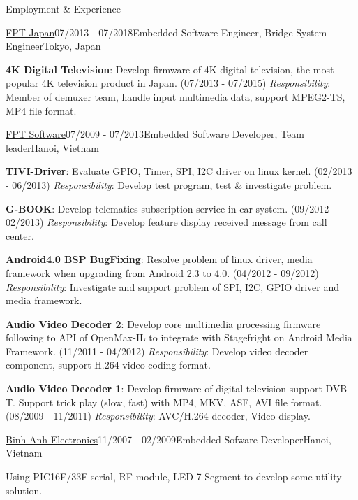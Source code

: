 \documentclass{resume}
\begin{document}
\begin{rSection}{Employment \& Experience}
\begin{rSubsection}{\href{https://www.fpt-software.jp/company-information/fpt-japan/}{\underline{FPT Japan}}}{07/2013 - 07/2018}{Embedded Software Engineer, Bridge System Engineer}{Tokyo, Japan}
    \item \textbf{4K Digital Television}: Develop firmware of 4K digital television, the most popular 4K television product in Japan. (07/2013 - 07/2015)
    \newline \textit{Responsibility}: Member of demuxer team, handle input multimedia data, support MPEG2-TS, MP4 file format.

    \end{rSubsection}

    \begin{rSubsection}{\href{https://www.fpt-software.com/}{\underline{FPT Software}}}{07/2009 - 07/2013}{Embedded Software Developer, Team leader}{Hanoi, Vietnam}
    \item \textbf{TIVI-Driver}: Evaluate GPIO, Timer, SPI, I2C driver on linux kernel. (02/2013 - 06/2013)
    \newline \textit{Responsibility}: Develop test program, test \& investigate problem.

    \item \textbf{G-BOOK}: Develop telematics subscription service in-car system. (09/2012 - 02/2013)
    \newline \textit{Responsibility}: Develop feature display received message from call center.

    \item \textbf{Android4.0 BSP BugFixing}: Resolve problem of linux driver, media framework when upgrading from Android 2.3 to 4.0. (04/2012 - 09/2012)
    \newline \textit{Responsibility}: Investigate and support problem of SPI, I2C, GPIO driver and media framework. 

    \item \textbf{Audio Video Decoder 2}: Develop core multimedia processing firmware following to API of OpenMax-IL to integrate with Stagefright on Android Media Framework. (11/2011 - 04/2012)
    \newline \textit{Responsibility}: Develop video decoder component, support H.264 video coding format.

    \item \textbf{Audio Video Decoder 1}: Develop firmware of digital television support DVB-T. Support trick play (slow, fast) with MP4, MKV, ASF, AVI file format. (08/2009 - 11/2011)
    \newline \textit{Responsibility}: AVC/H.264 decoder, Video display.
    \end{rSubsection}

    \begin{rSubsection}{\href{https://bagps.vn/}{\underline{Binh Anh Electronics}}}{11/2007 - 02/2009}{Embedded Sofware Developer}{Hanoi, Vietnam}
    \item Using PIC16F/33F serial, RF module, LED 7 Segment to develop some utility solution.
    \end{rSubsection}

  \end{rSection}
\end{document}
